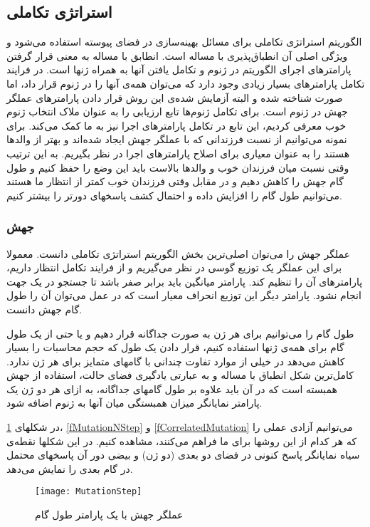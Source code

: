 \documentclass{report}
\begin{document}
\subsection{استراتژی تکاملی}
الگوریتم استراتژی تکاملی برای مسائل بهینه‌سازی در فضای پیوسته استفاده می‌شود و ویژگی اصلی آن انطباق‌پذیری با مساله است. انطابق با مساله به معنی قرار گرفتن پارامترهای اجرای الگوریتم در ژنوم و تکامل یافتن آنها به همراه ژنها است. در فرایند تکامل پارامترهای بسیار زیادی وجود دارد که می‌توان همه‌ی آنها را در ژنوم قرار داد، اما صورت شناخته شده و البته آزمایش شده‌ی  این روش قرار دادن پارامترهای عملگر جهش در ژنوم است. برای تکامل ژنوم‌ها تابع ارزیابی را به عنوان ملاک انتخاب ژنوم خوب معرفی کردیم، این تابع در تکامل پارامترهای اجرا نیز به ما کمک می‌کند. برای نمونه می‌توانیم از نسبت فرزندانی که با عملگر جهش ایجاد شده‌اند و بهتر از والدها هستند را به عنوان معیاری برای اصلاح پارامترهای اجرا در نظر بگیریم. به این ترتیب وقتی نسبت میان فرزندان خوب و والدها بالاست باید این وضع را حفظ کنیم و طول گام جهش را کاهش دهیم و در مقابل وقتی فرزندان خوب کمتر از انتظار ما هستند می‌توانیم طول گام را افزایش داده و احتمال کشف پاسخهای دورتر را بیشتر کنیم.

\subsubsection{جهش}
عملگر جهش را می‌توان اصلی‌ترین  بخش الگوریتم استراتژی تکاملی دانست. معمولا برای این عملگر یک توزیع گوسی در نظر می‌گیریم و از فرایند تکامل انتظار داریم، پارامترهای آن را تنظیم کند. پارامتر میانگین باید برابر صفر باشد تا جستجو در یک جهت انجام نشود. پارامتر دیگر این توزیع انحراف معیار است که در عمل می‌توان آن را طول گام جهش دانست. 

طول گام را می‌توانیم برای هر ژن به صورت جداگانه قرار دهیم و یا حتی از یک طول گام برای همه‌ی ژنها استفاده کنیم، قرار دادن یک طول که حجم محاسبات را بسیار کاهش می‌دهد در خیلی از موارد تفاوت چندانی با گامهای متمایز برای هر ژن ندارد. کامل‌ترین شکل انطباق با مساله و به عبارتی یادگیری فضای حالت، استفاده از جهش همبسته  است که در آن باید علاوه بر طول گامهای جداگانه، به ازای هر دو ژن یک پارامتر نمایانگر میزان همبستگی میان آنها به ژنوم اضافه شود.

در شکلهای \ref{fMutationStep}، \ref{fMutationNStep} و \ref{fCorrelatedMutation} می‌توانیم آزادی عملی را که هر کدام از این روشها برای ما فراهم می‌کنند، مشاهده کنیم. در این شکلها نقطه‌ی سیاه نمایانگر پاسخ کنونی در فضای دو بعدی (دو ژن) و بیضی دور آن پاسخهای محتمل در گام بعدی را نمایش می‌دهد.

\begin{figure}[!h] \centerline{\texttt{[image: MutationStep]}} \caption{\label{fMutationStep}
 عملگر جهش با یک پارامتر طول گام
 } \end{figure}
 
\end{document}
